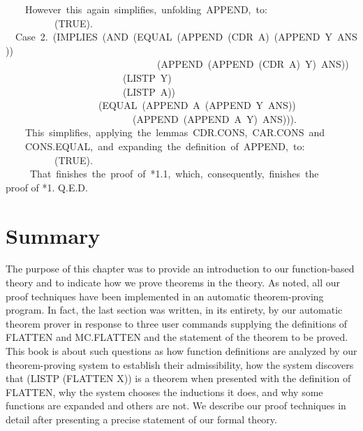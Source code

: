 \documentclass[10pt]{book}
\newenvironment{pubasis}{\begin{flushleft}}{\end{flushleft}}
\begin{document}
\begin{pubasis}
~~~~However~this~again~simplifies,~unfolding~APPEND,~to:\\

~~~~~~~~~~(TRUE).\\

~~Case~2.~(IMPLIES~(AND~(EQUAL~(APPEND~(CDR~A)~(APPEND~Y~ANS))\\
~~~~~~~~~~~~~~~~~~~~~~~~~~~~~~~(APPEND~(APPEND~(CDR~A)~Y)~ANS))\\
~~~~~~~~~~~~~~~~~~~~~~~~(LISTP~Y)\\
~~~~~~~~~~~~~~~~~~~~~~~~(LISTP~A))\\
~~~~~~~~~~~~~~~~~~~(EQUAL~(APPEND~A~(APPEND~Y~ANS))\\
~~~~~~~~~~~~~~~~~~~~~~~~~~(APPEND~(APPEND~A~Y)~ANS))).\\

~~~~This~simplifies,~applying~the~lemmas~CDR.CONS,~CAR.CONS~and\\
~~~~CONS.EQUAL,~and~expanding~the~definition~of~APPEND,~to:\\

~~~~~~~~~~(TRUE).\\

~~~~~That~finishes~the~proof~of~*1.1,~which,~consequently,~finishes~the\\
proof of *1.  Q.E.D.\\
\end{pubasis}
\section{Summary}
The purpose of this chapter was to provide an introduction to
our function-based theory and to indicate how we prove theorems in the theory.
As noted, all our proof techniques have
been implemented in an automatic theorem-proving program.
In fact, the last section was written, in its entirety,
by our automatic theorem prover in
response to three user commands supplying the definitions
of FLATTEN and MC.FLATTEN and the statement of the theorem to be
proved.
This book is about such questions as how function definitions are
analyzed by our theorem-proving system to establish their admissibility, how the system discovers that
(LISTP (FLATTEN X)) is a theorem when presented with the definition of
FLATTEN, why the system chooses the inductions it does, and why some
functions are expanded and others are not.  We describe our proof
techniques in detail after presenting a precise statement of our
formal theory.
\end{document}
